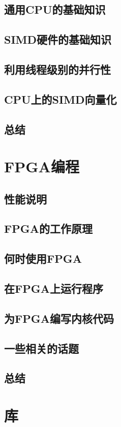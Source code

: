 \documentclass[11pt,a4paper,UTF8]{ctexart}
\begin{document}
		\subsection{通用CPU的基础知识}
		\subsection{SIMD硬件的基础知识}
		\subsection{利用线程级别的并行性}
		\subsection{CPU上的SIMD向量化}
		\subsection{总结}
	\section{FPGA编程}
		\subsection{性能说明}
		\subsection{FPGA的工作原理}
		\subsection{何时使用FPGA}
		\subsection{在FPGA上运行程序}
		\subsection{为FPGA编写内核代码}
		\subsection{一些相关的话题}
		\subsection{总结}
	\section{库}
\end{document}

